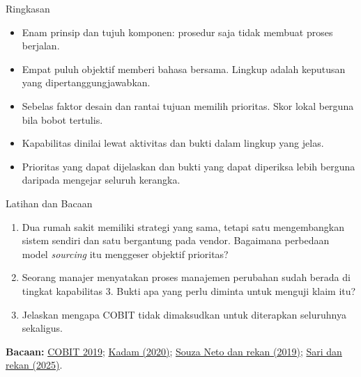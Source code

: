 \documentclass[aspectratio=169, table, 12pt]{beamer}
\begin{document}
\begin{frame}{{\Large Ringkasan}}
  \vspace{4pt}
  \small
  \begin{itemize}
    \item Enam prinsip dan tujuh komponen: prosedur saja tidak membuat proses berjalan.
    \item Empat puluh objektif memberi bahasa bersama. Lingkup adalah keputusan yang dipertanggungjawabkan.
    \item Sebelas faktor desain dan rantai tujuan memilih prioritas. Skor lokal berguna bila bobot tertulis.
    \item Kapabilitas dinilai lewat aktivitas dan bukti dalam lingkup yang jelas.
    \item Prioritas yang dapat dijelaskan dan bukti yang dapat diperiksa lebih berguna daripada mengejar seluruh kerangka.
  \end{itemize}
\end{frame}

\begin{frame}{{\Large Latihan dan Bacaan}}
  \vspace{2pt}
  \footnotesize
  \begin{enumerate}
    \item Dua rumah sakit memiliki strategi yang sama, tetapi satu mengembangkan sistem sendiri dan satu bergantung pada
          vendor. Bagaimana perbedaan model \textit{sourcing} itu menggeser objektif prioritas?
    \item Seorang manajer menyatakan proses manajemen perubahan sudah berada di tingkat kapabilitas 3. Bukti apa yang perlu
          diminta untuk menguji klaim itu?
    \item Jelaskan mengapa COBIT tidak dimaksudkan untuk diterapkan seluruhnya sekaligus.
  \end{enumerate}
  \vspace{4pt}
  \textbf{Bacaan:} \href{https://www.isaca.org/resources/cobit}{COBIT 2019};
  \href{https://www.isaca.org/resources/news-and-trends/industry-news/2020/evaluating-business-service-continuity-and-availability-using-cobit-2019}{Kadam (2020)};
  \href{https://www.isaca.org/resources/news-and-trends/industry-news/2019/defining-target-capability-levels-in-cobit-2019-a-proposal-for-refinement}{Souza Neto dan rekan (2019)};
  \href{https://doi.org/10.36040/jati.v9i3.13540}{Sari dan rekan (2025)}.
\end{frame}
\end{document}
